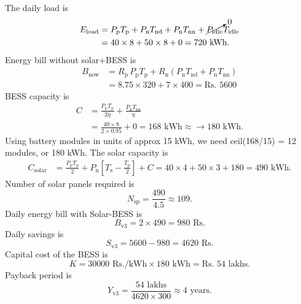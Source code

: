 The daily load is
\begin{align}
    E_{\text{load}} & = P_{\text{p}} T_{\text{p}} 
    + P_{\text{n}} T_{\text{nd}} + P_\text{n} T_\text{nn} 
    + \cancelto{0}{P_\text{idle}} T_\text{idle}
    \\
    & = 40 \times 8 + 50 \times 8 + 0 = 720 \text{ kWh}.  
\end{align}
Energy bill without solar+BESS is
\begin{align}
    B_{\text{now}} & = 
    R_\text{p} \, P_{\text{p}} T_{\text{p}} + R_\text{n} ( 
    P_{\text{n}} T_{\text{nd}}+ P_\text{n} T_\text{nn} )   \\
    &= 8.75 \times 320 + 7 \times 400 = \text{Rs. } 5600
\end{align}
BESS capacity is
\begin{align}
    C & = \frac{P_\text{p} T_\text{p} }{2 \eta} + \frac{P_\text{n} T_\text{nn} }{\eta} \\
    & = \frac{40 \times 8}{2 \times 0.95} + 0 = 168 \text{ kWh} \approx\to 180 \text{ kWh}.
\end{align}
Using battery modules in units of approx 15 kWh, we need ceil(168/15) = 12 modules, or 180 kWh.
The solar capacity is
\begin{align}
    C_{\text{solar}} & = 
    \frac{P_{\text{p}} T_{\text{p}} }{2} + P_{\text{n}} \left[T_{\text{s}} - \frac{T_{\text{p}}}{2} \right] + C
    = 40 \times 4 + 50 \times 3 + 180 = 490 \text{ kWh}.
\end{align}
Number of solar panels required is
\begin{equation}
    N_{\text{sp}} = \frac{490}{4.5} \approx 109.
\end{equation}
Daily energy bill with Solar-BESS is
\begin{equation}
    B_{\text{v3}} = 2 \times 490 = 980 \text{ Rs.}
\end{equation}
Daily savings is
\begin{equation}
    S_{\text{v3}} = 5600 - 980 = 4620 \text{ Rs.}
\end{equation}
Capital cost of the BESS is
\begin{equation}
    K = 30000 \text{ Rs./kWh} \times 180 \text{ kWh} = \text{Rs. }54 \text{ lakhs}.
\end{equation}
Payback period is
\begin{equation}
    Y_{\text{v3}} = \frac{54 \text{ lakhs}}{4620 \times 300} \approx 4 \text{ years}.
\end{equation}

